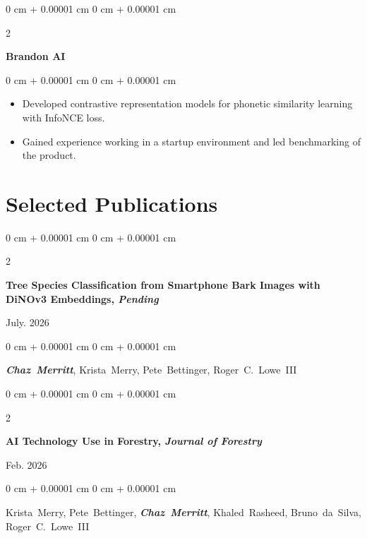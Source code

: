 \documentclass[10pt, letterpaper]{article}
\newenvironment{highlights}{
    \begin{itemize}[
        topsep=0.10 cm,
        parsep=0.10 cm,
        partopsep=0pt,
        itemsep=0pt,
        leftmargin=0 cm + 10pt
    ]
}{
    \end{itemize}
} %
\newenvironment{onecolentry}{
    \begin{adjustwidth}{
        0 cm + 0.00001 cm
    }{
        0 cm + 0.00001 cm
    }
}{
    \end{adjustwidth}
} %
\newenvironment{twocolentry}[2][]{
    \onecolentry
    \def\secondColumn{#2}
    \setcolumnwidth{\fill, 4.5 cm}
    \begin{paracol}{2}
}{
    \switchcolumn \raggedleft \secondColumn
    \end{paracol}
    \endonecolentry
} %
\begin{document}
        \vspace{0.2 cm}

        \begin{twocolentry}{
            2026
        }
            \textbf{Brandon AI}\end{twocolentry}

        \vspace{0.10 cm}
        \begin{onecolentry}
            \begin{highlights}
                \item Developed contrastive representation models for phonetic similarity learning with InfoNCE loss.
                \item Gained experience working in a startup environment and led benchmarking of the product.
            \end{highlights}
        \end{onecolentry}
        


    \section{Selected Publications}

        \begin{samepage}
            \begin{twocolentry}{
                July. 2026
            }
                 \textbf{Tree Species Classification from Smartphone Bark Images with DiNOv3 Embeddings, \textit{Pending}}
            \end{twocolentry}

            \begin{onecolentry}
                \mbox{\textbf{\textit{Chaz Merritt}}}, \mbox{Krista Merry}, \mbox{Pete Bettinger}, \mbox{Roger C. Lowe III}

                \vspace{0.10 cm}
        \end{onecolentry}
            \vspace{0.10 cm}
            
        \end{samepage}
        
        \begin{samepage}
            \begin{twocolentry}{
                Feb. 2026
            }
                \textbf{AI Technology Use in Forestry, \textit{Journal of Forestry}}
            \end{twocolentry}
            
            \begin{onecolentry}
                \mbox{Krista Merry}, \mbox{Pete Bettinger}, \mbox{\textbf{\textit{Chaz Merritt}}}, \mbox{Khaled Rasheed}, \mbox{Bruno da Silva}, \mbox{Roger C. Lowe III}

                \vspace{0.10 cm}
        \end{onecolentry}
        \end{samepage}
\end{document}
